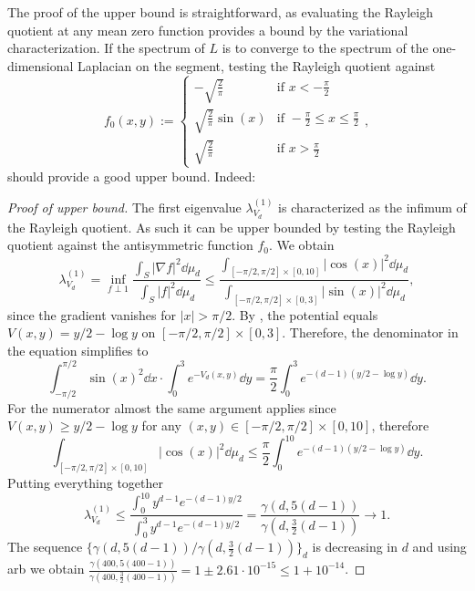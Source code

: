 The proof of the upper bound is straightforward, as evaluating the Rayleigh quotient at any mean zero function provides a bound by the variational characterization. If the spectrum of  $L$ is to converge to the spectrum of the one-dimensional Laplacian on the segment, testing the Rayleigh quotient against
\begin{equation*}
f_0(x,y) :=
\begin{cases}
    -\sqrt{\frac{2}{\pi}} & \text{if } x < -\frac{\pi}{2} \\
    \sqrt{\frac{2}{\pi}}\sin\left(x\right) & \text{if } -\frac{\pi}{2} \le x \le \frac{\pi}{2} \\
    \sqrt{\frac{2}{\pi}} & \text{if } x > \frac{\pi}{2}
\end{cases},
\end{equation*}
should provide a good upper bound. Indeed:
\begin{proof}[Proof of upper bound]
    The first eigenvalue \( \lambda^{(1)}_{V_d} \) is characterized as the infimum of the Rayleigh quotient. As such it can be upper bounded by testing the Rayleigh quotient against the antisymmetric function \( f_0 \).
    We obtain
    \begin{equation*}
        \lambda^{(1)}_{V_d} 
        = \inf_{f \perp 1} \frac{\int_S |\nabla f|^2 \dd{\mu_d}}{\int_S |f|^2 \dd{\mu_d}}
        \le \frac{\int_{[-\pi/2,\pi/2] \times[0,10]} |\cos(x)|^2 \dd{\mu_d}}{\int_{[-\pi/2,\pi/2] \times[0,3]} |\sin(x)|^2 \dd{\mu_d}},
    \end{equation*}
    since the gradient vanishes for \( |x| > \pi/2 \). By , the potential equals \( V(x,y) = y/2 - \log y \)  on \( [-\pi/2,\pi/2] \times [0,3] \). Therefore, the denominator in the equation simplifies to 
    \begin{equation*}
        \int_{-\pi/2}^{\pi/2} \sin(x)^2 \dd{x} \cdot \int_0^3 e^{-V_d(x,y)} \dd{y}
        = \frac{\pi}{2} \int_0^3 e^{-(d-1)(y/2 - \log y)} \dd{y}.
    \end{equation*}
    For the numerator almost the same argument applies since \( V(x,y) \ge y/2 - \log y \) for any \( (x,y) \in [-\pi/2,\pi/2] \times [0,10] \), therefore 
    \begin{equation*}
        \int_{[-\pi/2,\pi/2] \times[0,10]} |\cos(x)|^2 \dd{\mu_d} \le \frac{\pi}{2}\int_0^{10} e^{-(d-1)(y/2-\log y)} \dd{y}.
    \end{equation*}
    Putting everything together
    \begin{equation*}
        \lambda^{(1)}_{V_d} 
        \le \frac{\int_0^{10} y^{d-1}e^{-(d-1) y/2}}{\int_0^{3} y^{d-1}e^{-(d-1) y/2}}
        = \frac{\gamma(d,5(d-1))}{\gamma(d,\frac{3}{2}(d-1))}
        \to 1.
    \end{equation*}
    The sequence \( \{ \gamma(d,5(d-1)) / \gamma(d,\frac{3}{2}(d-1)) \}_d \) is decreasing in \( d \) and using arb we obtain \( \frac{\gamma(400,5(400-1))}{\gamma(400,\frac{3}{2}(400-1))} = 1 \pm 2.61 \cdot 10^{-15} \le 1 + 10^{-14} \).
\end{proof}


